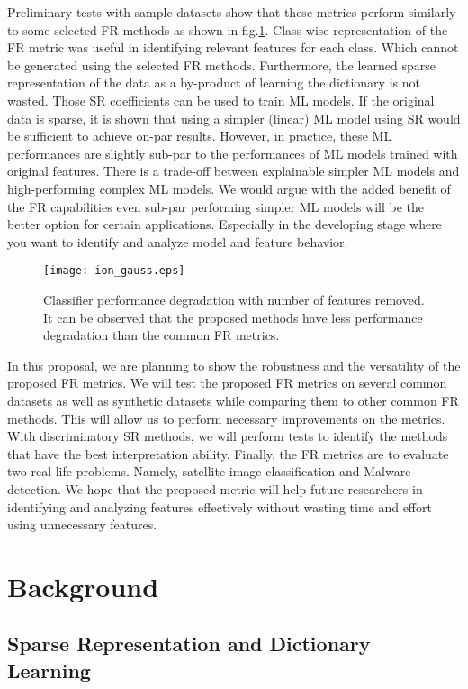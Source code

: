 Preliminary tests with sample datasets show that these metrics perform similarly to some selected FR methods as shown in fig.\ref{fig: FR_degradation}. Class-wise representation of the FR metric was useful in identifying relevant features for each class. Which cannot be generated using the selected FR methods. Furthermore, the learned sparse representation of the data as a by-product of learning the dictionary is not wasted. Those SR coefficients can be used to train ML models. If the original data is sparse, it is shown that using a simpler (linear) ML model using SR would be sufficient to achieve on-par results. However, in practice, these ML performances are slightly sub-par to the performances of ML models trained with original features. There is a trade-off between explainable simpler ML models and high-performing complex ML models. We would argue with the added benefit of the FR capabilities even sub-par performing simpler ML models will be the better option for certain applications. Especially in the developing stage where you want to identify and analyze model and feature behavior.

\begin{figure}[!t]
    \centering
    \texttt{[image: ion\_gauss.eps]}
    \caption{Classifier performance degradation with number of features removed. It can be observed that the proposed methods have less performance degradation than the common FR metrics.}\label{fig: FR_degradation}
\end{figure}

In this proposal, we are planning to show the robustness and the versatility of the proposed FR metrics. We will test the proposed FR metrics on several common datasets as well as synthetic datasets while comparing them to other common FR methods. This will allow us to perform necessary improvements on the metrics. With discriminatory SR methods, we will perform tests to identify the methods that have the best interpretation ability. Finally, the FR metrics are to evaluate two real-life problems. Namely, satellite image classification and Malware detection. We hope that the proposed metric will help future researchers in identifying and analyzing features effectively without wasting time and effort using unnecessary features.

\section{Background}

\subsection{Sparse Representation and Dictionary Learning}


